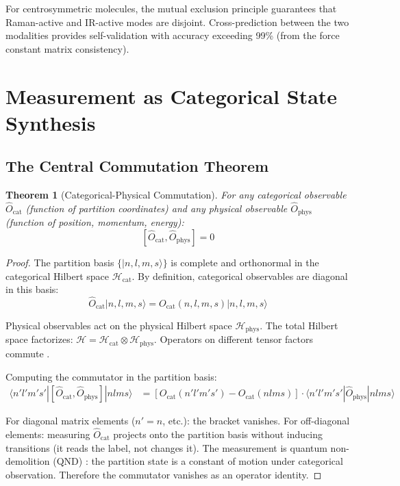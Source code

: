 \documentclass[11pt,a4paper]{article}
\newtheorem{theorem}{Theorem}[section]
\theoremstyle{definition}
\theoremstyle{remark}
\newcommand{\Hilbert}{\mathcal{H}}
\begin{document}
For centrosymmetric molecules, the mutual exclusion principle \citep{wilson1955, long2002} guarantees that Raman-active and IR-active modes are disjoint. Cross-prediction between the two modalities provides self-validation with accuracy exceeding 99\% (from the force constant matrix consistency).

\section{Measurement as Categorical State Synthesis}
\label{sec:measurement_synthesis}

\subsection{The Central Commutation Theorem}

\begin{theorem}[Categorical-Physical Commutation]
\label{thm:commutation}
For any categorical observable $\hat{O}_{\mathrm{cat}}$ (function of partition coordinates) and any physical observable $\hat{O}_{\mathrm{phys}}$ (function of position, momentum, energy):
\begin{equation}
\boxed{[\hat{O}_{\mathrm{cat}}, \hat{O}_{\mathrm{phys}}] = 0}
\label{eq:commutation}
\end{equation}
\end{theorem}

\begin{proof}
The partition basis $\{|n, l, m, s\rangle\}$ is complete and orthonormal in the categorical Hilbert space $\Hilbert_{\mathrm{cat}}$. By definition, categorical observables are diagonal in this basis:
\begin{equation}
\hat{O}_{\mathrm{cat}} |n, l, m, s\rangle = O_{\mathrm{cat}}(n, l, m, s) |n, l, m, s\rangle
\end{equation}

Physical observables act on the physical Hilbert space $\Hilbert_{\mathrm{phys}}$. The total Hilbert space factorizes: $\Hilbert = \Hilbert_{\mathrm{cat}} \otimes \Hilbert_{\mathrm{phys}}$. Operators on different tensor factors commute \citep{sakurai2017}.

Computing the commutator in the partition basis:
\begin{align}
\langle n'l'm's' | [\hat{O}_{\mathrm{cat}}, \hat{O}_{\mathrm{phys}}] | nlms \rangle &= [O_{\mathrm{cat}}(n'l'm's') - O_{\mathrm{cat}}(nlms)] \cdot \langle n'l'm's' | \hat{O}_{\mathrm{phys}} | nlms \rangle
\end{align}

For diagonal matrix elements ($n' = n$, etc.): the bracket vanishes. For off-diagonal elements: measuring $\hat{O}_{\mathrm{cat}}$ projects onto the partition basis without inducing transitions (it reads the label, not changes it). The measurement is quantum non-demolition (QND) \citep{braginsky1980, caves1980}: the partition state is a constant of motion under categorical observation. Therefore the commutator vanishes as an operator identity.
\end{proof}
\end{document}
